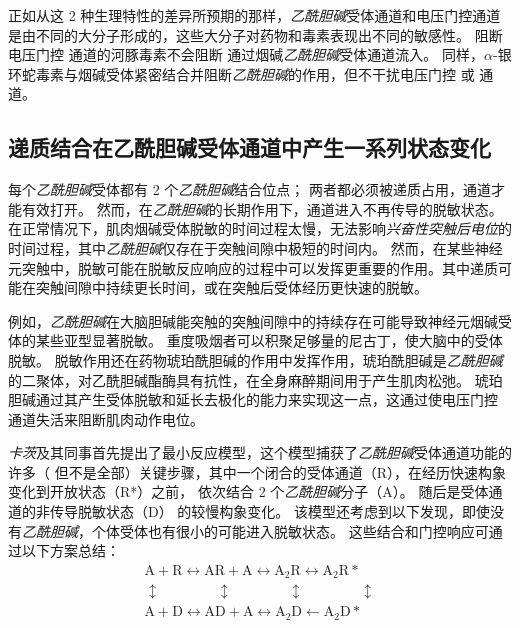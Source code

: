 正如从这 2 种生理特性的差异所预期的那样，\textit{乙酰胆碱}受体通道和电压门控通道是由不同的大分子形成的，这些大分子对药物和毒素表现出不同的敏感性。
阻断电压门控  通道的河豚毒素不会阻断  通过烟碱\textit{乙酰胆碱}受体通道流入。
同样，$\alpha$-银环蛇毒素与烟碱受体紧密结合并阻断\textit{乙酰胆碱}的作用，但不干扰电压门控  或  通道。



\subsection{递质结合在乙酰胆碱受体通道中产生一系列状态变化}

每个\textit{乙酰胆碱}受体都有 2 个\textit{乙酰胆碱}结合位点；
两者都必须被递质占用，通道才能有效打开。
然而，在\textit{乙酰胆碱}的长期作用下，通道进入不再传导的脱敏状态。
在正常情况下，肌肉烟碱受体脱敏的时间过程太慢，无法影响\textit{兴奋性突触后电位}的时间过程，其中\textit{乙酰胆碱}仅存在于突触间隙中极短的时间内。
然而，在某些神经元突触中，脱敏可能在脱敏反应响应的过程中可以发挥更重要的作用。其中递质可能在突触间隙中持续更长时间，或在突触后受体经历更快速的脱敏。


例如，\textit{乙酰胆碱}在大脑胆碱能突触的突触间隙中的持续存在可能导致神经元烟碱受体的某些亚型显著脱敏。
重度吸烟者可以积聚足够量的尼古丁，使大脑中的受体脱敏。
脱敏作用还在药物琥珀酰胆碱的作用中发挥作用，琥珀酰胆碱是\textit{乙酰胆碱}的二聚体，对乙酰胆碱酯酶具有抗性，在全身麻醉期间用于产生肌肉松弛。
琥珀胆碱通过其产生受体脱敏和延长去极化的能力来实现这一点，这通过使电压门控  通道失活来阻断肌肉动作电位。


\textit{卡茨}及其同事首先提出了最小反应模型，这个模型捕获了\textit{乙酰胆碱}受体通道功能的许多（ 但不是全部）关键步骤，其中一个闭合的受体通道（R），在经历快速构象变化到开放状态（R*）之前， 依次结合 2 个\textit{乙酰胆碱}分子（A）。
随后是受体通道的非传导脱敏状态（D） 的较慢构象变化。
该模型还考虑到以下发现，即使没有\textit{乙酰胆碱}，个体受体也有很小的可能进入脱敏状态。
这些结合和门控响应可通过以下方案总结：
\begin{align*} \label{binding_gating_reactions}
	\text{A}+\text{R} \leftrightarrow \text{AR} + \text{A} \leftrightarrow \text{A}_2 \text{R} \leftrightarrow \text{A}_2 \text{R} *  \\
	\updownarrow \qquad \qquad \updownarrow \qquad \qquad \updownarrow \qquad \qquad \updownarrow  \\ 
	\text{A}+\text{D} \leftrightarrow \text{AD} + \text{A} \leftrightarrow \text{A}_2 \text{D} \leftarrow \text{A}_2 \text{D} * \nonumber
\end{align*}


